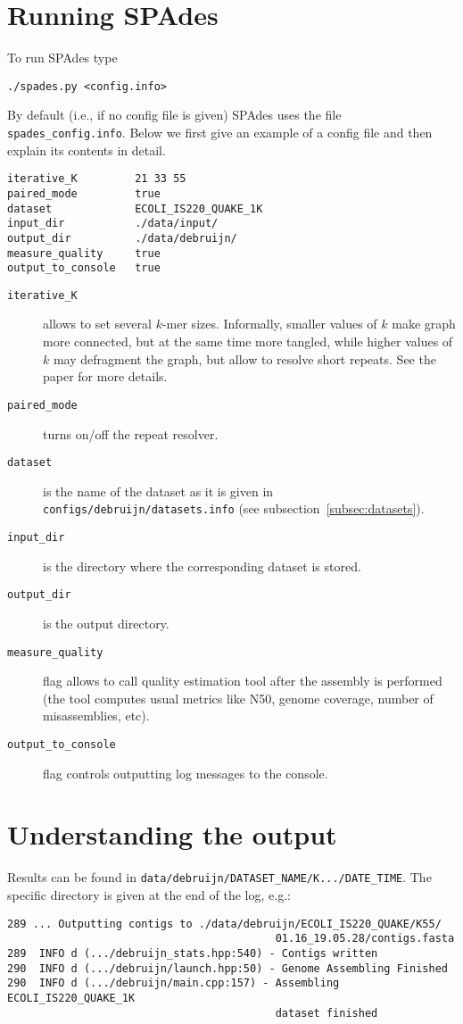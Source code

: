 \documentclass{article}
\def\spades{SPAdes}
\begin{document}
\section{Running {\spades}}
To run {\spades} type
\begin{lstlisting}
./spades.py <config.info>
\end{lstlisting}
By default (i.e., if no config file is given) {\spades} uses the file {\tt spades\_config.info}. Below we first give an example of a config file
and then explain its contents in detail.

\begin{lstlisting}
iterative_K         21 33 55
paired_mode         true 
dataset             ECOLI_IS220_QUAKE_1K
input_dir           ./data/input/
output_dir          ./data/debruijn/
measure_quality     true
output_to_console   true
\end{lstlisting}

\begin{description}
\item[{\tt iterative\_K}] allows to set several $k$-mer sizes. Informally, smaller values of $k$ make graph more connected,
but at the same time more tangled, while higher values of $k$ may defragment the graph, but allow to resolve short repeats.
See the paper for more details.
\item[{\tt paired\_mode}] turns on/off the repeat resolver.
\item[{\tt dataset}] is the name of the dataset as it is given in {\tt configs/debruijn/datasets.info} (see subsection~\ref{subsec:datasets}).
\item[{\tt input\_dir}] is the directory where the corresponding dataset is stored.
\item[{\tt output\_dir}] is the output directory.
\item[{\tt measure\_quality}] flag allows to call quality estimation tool after the assembly is performed (the tool computes usual
metrics like N50, genome coverage, number of misassemblies, etc).
\item[{\tt output\_to\_console}] flag controls outputting log messages to the console.
\end{description}

\section{Understanding the output}
Results can be found in {\tt data/debruijn/DATASET\_NAME/K.../DATE\_TIME}.
The specific directory is given at the end of the log, e.g.:
\begin{lstlisting}
289 ... Outputting contigs to ./data/debruijn/ECOLI_IS220_QUAKE/K55/
                                          01.16_19.05.28/contigs.fasta
289  INFO d (.../debruijn_stats.hpp:540) - Contigs written
290  INFO d (.../debruijn/launch.hpp:50) - Genome Assembling Finished
290  INFO d (.../debruijn/main.cpp:157) - Assembling ECOLI_IS220_QUAKE_1K 
                                          dataset finished
\end{lstlisting}
\end{document}
